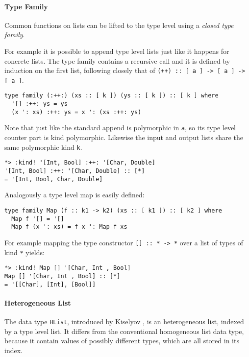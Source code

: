 \documentclass[../Thesis.tex]{subfiles}
\begin{document}
	\paragraph{Type Family}
	Common functions on lists can be lifted to the type level
	using a \emph{closed type family}.

	For example it is possible to append type level lists just like
	it happens for concrete lists.
	The type family contains a recursive call and it is defined
	by induction on the first list, following closely that
	of \texttt{(++) :: [ a ] -> [ a ] -> [ a ]}.
\begin{verbatim}	
type family (:++:) (xs :: [ k ]) (ys :: [ k ]) :: [ k ] where
  '[] :++: ys = ys
  (x ': xs) :++: ys = x ': (xs :++: ys)
\end{verbatim}

	Note that just like the standard append is polymorphic in \texttt{a}, so its 
	type level counter part is	kind polymorphic. 
	Likewise the input and output lists share the same polymorphic kind 
	\texttt{k}.
	
\begin{verbatim}
*> :kind! '[Int, Bool] :++: '[Char, Double]
'[Int, Bool] :++: '[Char, Double] :: [*]
= '[Int, Bool, Char, Double]
\end{verbatim}
	
	Analogously a type level map is easily defined:
\begin{verbatim}
type family Map (f :: k1 -> k2) (xs :: [ k1 ]) :: [ k2 ] where
  Map f '[] = '[] 
  Map f (x ': xs) = f x ': Map f xs
\end{verbatim}
	
	For example mapping the type constructor \texttt{[] :: * -> *} over a list
	of types of kind \texttt{*} yields:
	
\begin{verbatim}
*> :kind! Map [] '[Char, Int , Bool]
Map [] '[Char, Int , Bool] :: [*]
= '[[Char], [Int], [Bool]]
\end{verbatim}

	\paragraph{Heterogeneous List}
	\label{par:HLIst}
	The data type \texttt{HList}, introduced by Kiselyov 
	\cite{Kiselyov04stronglytyped}, is an heterogeneous list, 
	indexed by a type level list. 
	It differs from the conventional homogeneous list data type, because it 
	contain values of possibly different types, which are all 
	stored in its index.
\end{document}
